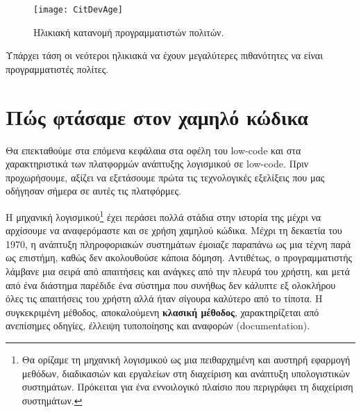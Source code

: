                     \begin{figure}[H] \noindent \centering
                            \texttt{[image: CitDevAge]}
                            \caption{Ηλικιακή κατανομή προγραμματιστών πολιτών. \cite{CitDevTrackVia}}
                    \end{figure}

                    \vspace{-2.5em}
                    \begin{displayquote}
                        \small Υπάρχει τάση οι νεότεροι ηλικιακά να έχουν μεγαλύτερες πιθανότητες να είναι προγραμματιστές πολίτες.
                    \end{displayquote}


    \section{Πώς φτάσαμε στον χαμηλό κώδικα}
        Θα επεκταθούμε στα επόμενα κεφάλαια στα οφέλη του low-code και στα χαρακτηριστικά των πλατφορμών ανάπτυξης λογισμικού σε low-code. Πριν προχωρήσουμε, αξίζει να εξετάσουμε πρώτα τις τεχνολογικές εξελίξεις που μας οδήγησαν σήμερα σε αυτές τις πλατφόρμες.

        Η μηχανική λογισμικού\footnote{Θα ορίζαμε τη μηχανική λογισμικού ως μια πειθαρχημένη και αυστηρή εφαρμογή μεθόδων, διαδικασιών και εργαλείων στη διαχείριση και ανάπτυξη υπολογιστικών συστημάτων. Πρόκειται για ένα εννοιλογικό πλαίσιο που περιγράφει τη διαχείριση συστημάτων.} έχει περάσει πολλά στάδια στην ιστορία της μέχρι να αρχίσουμε να αναφερόμαστε και σε χρήση χαμηλού κώδικα. Μέχρι τη δεκαετία του 1970, η ανάπτυξη πληροφοριακών συστημάτων έμοιαζε παραπάνω ως μια τέχνη παρά ως επιστήμη, καθώς δεν ακολουθούσε κάποια δόμηση. Αντιθέτως, ο προγραμματιστής λάμβανε μια σειρά από απαιτήσεις και ανάγκες από την πλευρά του χρήστη, και μετά από ένα διάστημα παρέδιδε ένα σύστημα που συνήθως δεν κάλυπτε εξ ολοκλήρου όλες τις απαιτήσεις του χρήστη αλλά ήταν σίγουρα καλύτερο από το τίποτα. Η συγκεκριμένη μέθοδος, αποκαλούμενη \textbf{κλασική μέθοδος}, χαρακτηρίζεται από ανεπίσημες οδηγίες, έλλειψη τυποποίησης και αναφορών (documentation).

